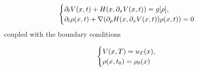 \documentclass{article}
\begin{document}
\begin{equation}\label{reduced_mfg:mfg_system}
    \begin{cases}
        \partial_t V (x,t) + H(x,\partial_x V(x,t)) = g[\rho], \\
        \partial_t \rho(x,t) + \nabla(\partial_p H(x, \partial_x V (x,t)) \rho(x,t)) = 0
\end{cases}
\end{equation}
coupled with the boundary conditions

\begin{equation}\label{reduced_mfg:mfg_boundary_conditions}
\begin{cases}
    V(x,T) = u_T(x), \\
    \rho(x,t_0) = \rho_0(x)
\end{cases}
\end{equation}
\end{document}
